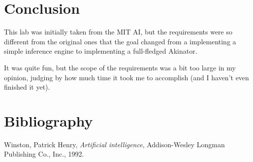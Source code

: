 \documentclass[11pt]{article}
\begin{document}
\section{Conclusion}
\label{sec:orgd4f52e6}

This lab was initially taken from the MIT AI,
but the requirements were so different from the original ones
that the goal changed from a implementing a simple inference engine
to implementing a full-fledged Akinator.

It was quite fun, but the scope of the requirements was a bit too large in my opinion,
judging by how much time it took me to accomplish (and I haven't even finished it yet).

\section{Bibliography}
\label{sec:orgd49358d}

\noindent
[1] Winston, Patrick Henry, \emph{Artificial intelligence}, Addison-Wesley Longman Publishing Co., Inc., 1992.
\end{document}
